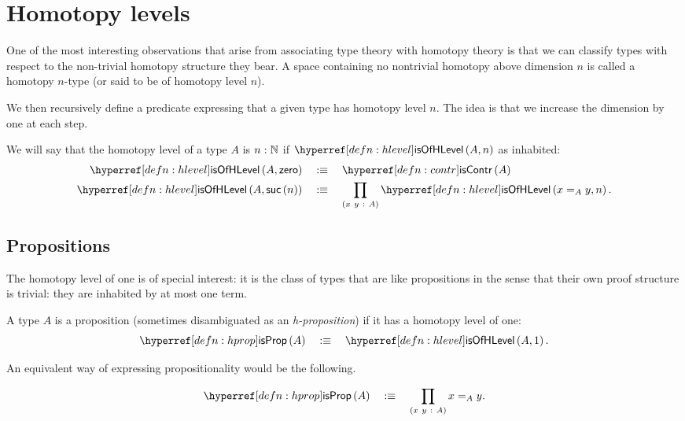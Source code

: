 \section{Homotopy levels}

One of the most interesting observations that arise from associating type theory with
homotopy theory is that we can classify types with respect to the non-trivial homotopy
structure they bear. A space containing no nontrivial homotopy above dimension $n$ is
called a homotopy $n$-type (or said to be of homotopy level $n$).

We then recursively define a predicate expressing that a given type has homotopy level
$n$. The idea is that we increase the dimension by one at each step.
\begin{defn}\label{defn:hlevel}
  We will say that the homotopy level of a type $A$ is $n\hspace{0.1mm}:\hspace{0.1mm}\mathbb{N}$ if
  $\isofhlevel{A}{n}$ as inhabited:
  \begin{align*}
    \isofhlevel{A}{\zero{}} &\quad\is\quad \iscontr{A}\\
    \isofhlevel{A}{\suc{n}} &\quad\is\quad \pity{x~y}{A}{\isofhlevel{x =_A y}{n}}.
  \end{align*}
\end{defn}

\subsection{Propositions}

The homotopy level of one is of special interest: it is the class of types that are like
propositions in the sense that their own proof structure is trivial: they are inhabited by
at most one term.

\begin{defn}[Proposition]\label{defn:prop'}
  A type $A$ is a proposition (sometimes disambiguated as an \emph{h-proposition}) if it
  has a homotopy level of one:
  \begin{equation*}
    \isprop{A} \quad\is\quad \isofhlevel{A}{1}.
  \end{equation*}
\end{defn}

An equivalent way of expressing propositionality would be the following.
\begin{defn}\label{defn:hprop}
  \begin{equation*}
    \isprop{A} \quad\is\quad \pity{x~y}{A}{x =_A y}.
  \end{equation*}
\end{defn}

